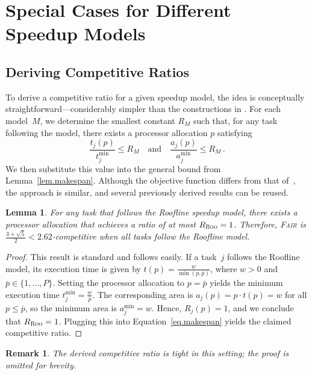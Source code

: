 \documentclass{article}
\newtheorem{lemma}{Lemma}
\newtheorem{remark}{Remark}
\newcommand\fair{\textsc{Fair}\xspace}
\newcommand\ratio{R\xspace}
\newcommand\ROO{\textsc{Roo}\xspace}
\begin{document}
\section{Special Cases for Different Speedup Models}
\label{sec.anamodel}

\subsection{Deriving Competitive Ratios}

To derive a competitive ratio for a given speedup model, the idea is conceptually straightforward—considerably simpler than the constructions in \cite{ICPP22, TOPC24}.  
For each model~$M$, we determine the smallest constant $\ratio_M$ such that, for any task following the model, there exists a processor allocation $p$ satisfying
\[
\frac{t_j(p)}{t_j^{\min}} \le \ratio_M
\quad \text{and} \quad
\frac{a_j(p)}{a_j^{\min}} \le \ratio_M \,.
\]
We then substitute this value into the general bound from Lemma~\ref{lem.makespan}.  
Although the objective function differs from that of~\cite{TOPC24}, the approach is similar, and several previously derived results can be reused.

\begin{lemma}\label{lem.roofline}
For any task that follows the Roofline speedup model, there exists a processor allocation that achieves a ratio of at most $\ratio_{\ROO} = 1$.  
Therefore, \fair is $\frac{3 + \sqrt{5}}{2} <2.62$-competitive when all tasks follow the Roofline model.
\end{lemma}

\begin{proof}
This result is standard and follows easily.  
If a task~$j$ follows the Roofline model, its execution time is given by $t(p) = \frac{w}{\min(p, \bar{p})}$, where $w > 0$ and $\bar{p} \in \{1, \dots, P\}$.  
Setting the processor allocation to $p = \bar{p}$ yields the minimum execution time $t_j^{\min} = \frac{w}{\bar{p}}$.  
The corresponding area is $a_j(p) = p \cdot t(p) = w$ for all $p \le \bar{p}$, so the minimum area is $a_j^{\min} = w$.  
Hence, $\ratio_j(p) = 1$, and we conclude that $\ratio_{\ROO} = 1$.  
Plugging this into Equation~\eqref{eq.makespan} yields the claimed competitive ratio.
\end{proof}

\begin{remark}
The derived competitive ratio is tight in this setting; the proof is omitted for brevity.
\end{remark}
\end{document}
